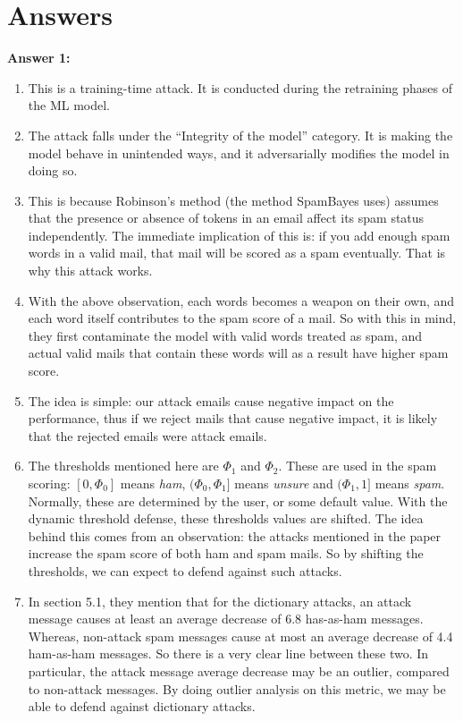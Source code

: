 \documentclass[12pt,reqno]{amsart}
\begin{document}
\section*{Answers}
\textbf{Answer 1:} 
\begin{enumerate}[label=(\alph*)]
\item This is a training-time attack. It is conducted during the retraining phases of the ML model.

\item The attack falls under the ``Integrity of the model'' category. It is making the model behave in unintended ways, and it adversarially modifies the model in doing so.

\item This is because Robinson's method (the method SpamBayes uses) assumes that the presence or absence of tokens in an email affect its spam status independently. The immediate implication of this is: if you add enough spam words in a valid mail, that mail will be scored as a spam eventually. That is why this attack works.

\item With the above observation, each words becomes a weapon on their own, and each word itself contributes to the spam score of a mail. So with this in mind, they first contaminate the model with valid words treated as spam, and actual valid mails that contain these words will as a result have higher spam score.

\item The idea is simple: our attack emails cause negative impact on the performance, thus if we reject mails that cause negative impact, it is likely that the rejected emails were attack emails.

\item The thresholds mentioned here are $\Phi_1$ and $\Phi_2$. These are used in the spam scoring: $[0, \Phi_0]$ means \textit{ham}, $(\Phi_0, \Phi_1]$ means \textit{unsure} and $(\Phi_1, 1]$ means \textit{spam}. Normally, these are determined by the user, or some default value. With the dynamic threshold defense, these thresholds values are shifted. The idea behind this comes from an observation: the attacks mentioned in the paper increase the spam score of both ham and spam mails. So by shifting the thresholds, we can expect to defend against such attacks.

\item In section 5.1, they mention that for the dictionary attacks, an attack message causes at least an average decrease of 6.8 has-as-ham messages. Whereas, non-attack spam messages cause at most an average decrease of 4.4 ham-as-ham messages. So there is a very clear line between these two. In particular, the attack message average decrease may be an outlier, compared to non-attack messages. By doing outlier analysis on this metric, we may be able to defend against dictionary attacks.
\end{enumerate}
\end{document}
